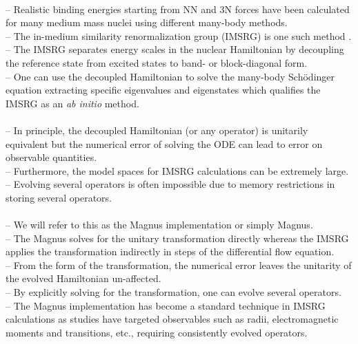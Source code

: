 \documentclass[preprintnumbers,floatfix,aps,prc,preprint,nofootinbib]{revtex4-1}
\begin{document}
\\
-- Realistic binding energies starting from NN and 3N forces have been calculated for many medium mass nuclei using different many-body methods.
\\
-- The in-medium similarity renormalization group (IMSRG) is one such method \cite{Hergert:2015awm, Hergert:2016iju}.
\\
-- The IMSRG separates energy scales in the nuclear Hamiltonian by decoupling the reference state from excited states to band- or block-diagonal form.
\\
-- One can use the decoupled Hamiltonian to solve the many-body Sch{\"o}dinger equation extracting specific eigenvalues and eigenstates which qualifies the IMSRG as an \textit{ab initio} method.
\\


\\
-- In principle, the decoupled Hamiltonian (or any operator) is unitarily equivalent but the numerical error of solving the ODE can lead to error on observable quantities.
\\
-- Furthermore, the model spaces for IMSRG calculations can be extremely large.
\\
-- Evolving several operators is often impossible due to memory restrictions in storing several operators.
\\


\\
-- We will refer to this as the Magnus implementation or simply Magnus.
\\
-- The Magnus solves for the unitary transformation directly whereas the IMSRG applies the transformation indirectly in steps of the differential flow equation.
\\
-- From the form of the transformation, the numerical error leaves the unitarity of the evolved Hamiltonian un-affected.
\\
-- By explicitly solving for the transformation, one can evolve several operators.
\\
-- The Magnus implementation has become a standard technique in IMSRG calculations as studies have targeted observables such as radii, electromagnetic moments and transitions, etc., requiring consistently evolved operators.
\\
\end{document}
